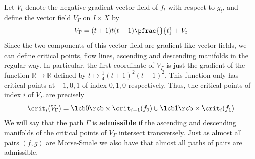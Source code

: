 Let $V_t$ denote the negative gradient vector field of $f_t$ with respect to $g_t$, and define the vector field $V_\Gamma$ on $I \times X$ by
\begin{equation}
\label{path of pairs vector field}
V_\Gamma = (t+1)t(t-1) \pfrac{}{t} + V_t
\end{equation}
Since the two components of this vector field are gradient like vector fields, we can define critical points, flow lines, ascending and descending manifolds in the regular way. In particular, the first coordinate of $V_\Gamma$ is just the gradient of the function $\mathbb R \rightarrow \mathbb R$ defined by $t \mapsto \frac{1}{4}(t+1)^2(t-1)^2$. This function only has critical points at $-1,0,1$ of index $0,1,0$ respectively. Thus, the critical points of index $i$ of $V_\Gamma$ are precisely
\begin{equation}
\label{critical points of V}
\crit_i(V_\Gamma) = \lcb 0 \rcb \times \crit_{i-1}(f_0) \cup \lcb 1 \rcb \times \crit_i(f_1)
\end{equation}
We will say that the path $\Gamma$ is \textbf{admissible} if the ascending and descending manifolds of the critical points of $V_\Gamma$ intersect transversely. Just as almost all pairs $(f,g)$ are Morse-Smale we also have that almost all paths of pairs are admissible.

